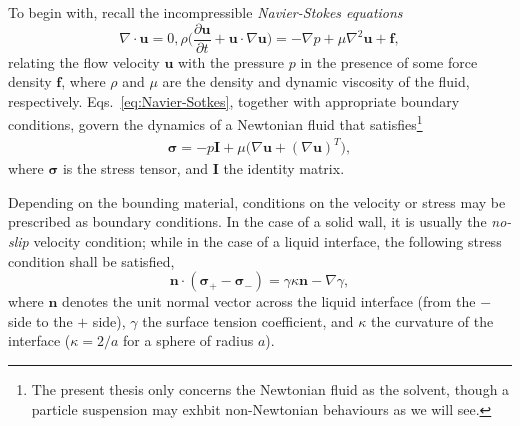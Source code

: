 \bigskip

To begin with, recall the incompressible \emph{Navier-Stokes equations}
\begin{subequations} \label{eq:Navier-Sotkes}
 \begin{equation}
   \nabla \cdot {\bm u} = 0,
  \label{eq:div-free}
 \end{equation}
 \begin{equation}
   \rho \bigg(\frac{\partial {\bm u}}{\partial t} + {\bm u} \cdot \nabla {\bm u} \bigg) = -\nabla p + \mu \nabla ^2  {\bm u} + {\bm f},
  \label{eq:NS}
 \end{equation}
\end{subequations}
relating the flow velocity $\bm u$ with the pressure $p$ in the presence of some force density $\bm f$, where $\rho$ and $\mu$ are the density and dynamic viscosity of the fluid, respectively.
Eqs.\ \eqref{eq:Navier-Sotkes}, together with appropriate boundary conditions, govern the dynamics of a Newtonian fluid that satisfies\footnote{The present thesis only concerns the Newtonian fluid as the solvent, though a particle suspension may exhbit non-Newtonian behaviours as we will see.}
\begin{equation}
 \begin{aligned}
   {\bm \sigma} = -p {\bm I}+ \mu \bigg( \nabla {\bm u} + (\nabla {\bm u})^T \bigg),
 \end{aligned}
\end{equation}
where $\bm \sigma$ is the stress tensor, and $\bm I$ the identity matrix.

Depending on the bounding material, conditions on the velocity or stress may be prescribed as boundary conditions. In the case of a solid wall, it is usually the \emph{no-slip} velocity condition; while in the case of a liquid interface, the following stress condition shall be satisfied,
\begin{equation} \label{eq:stress-bc}
  {\bm n} \cdot ({\bm \sigma}_+ - {\bm \sigma}_- )  = \gamma \kappa {\bm n} - \nabla \gamma,
\end{equation}
where $\bm n$ denotes the unit normal vector across the liquid interface (from the $-$ side to the $+$ side), $\gamma$ the surface tension coefficient, and $\kappa$ the curvature of the interface (\eg $\kappa=2/a$ for a sphere of radius $a$). 

